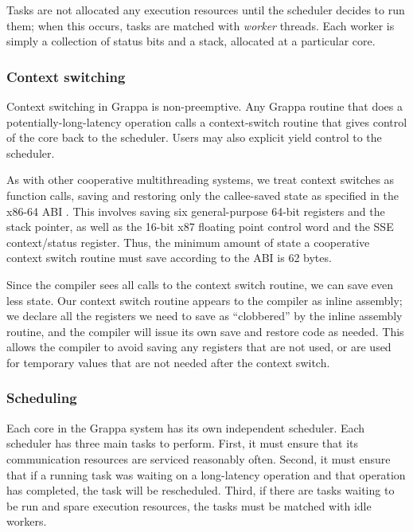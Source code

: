 Tasks are not allocated any execution resources until the scheduler
decides to run them; when this occurs, tasks are matched with {\em
  worker} threads. Each worker is simply a collection of status bits and a
stack, allocated at a particular core.


\subsubsection{Context switching}

Context switching in Grappa is non-preemptive. Any Grappa routine that
does a potentially-long-latency operation calls a context-switch
routine that gives control of the core back to the scheduler. Users
may also explicit yield control to the scheduler.

As with other cooperative multithreading systems, we treat context
switches as function calls, saving and restoring only the callee-saved
state as specified in the x86-64 ABI . This involves saving
six general-purpose 64-bit registers and the stack pointer, as well as
the 16-bit x87 floating point control word and the SSE context/status
register. Thus, the minimum amount of state a cooperative context
switch routine must save according to the ABI is 62 bytes.

Since the compiler sees all calls to the context switch routine, we
can save even less state. Our context switch routine appears to the
compiler as inline assembly; we declare all the registers we need
to save as ``clobbered'' by the inline assembly routine, and the
compiler will issue its own save and restore code as needed. This allows the
compiler to avoid saving any registers that are not used, or are used
for temporary values that are not needed after the context switch.

\subsubsection{Scheduling}

Each core in the Grappa system has its own independent scheduler. Each
scheduler has three main tasks to perform.  First, it must ensure that
its communication resources are serviced reasonably often. Second, it
must ensure that if a running task was waiting on a long-latency
operation and that operation has completed, the task will be
rescheduled. Third, if there are tasks waiting to be run and spare
execution resources, the tasks must be matched with idle workers.

